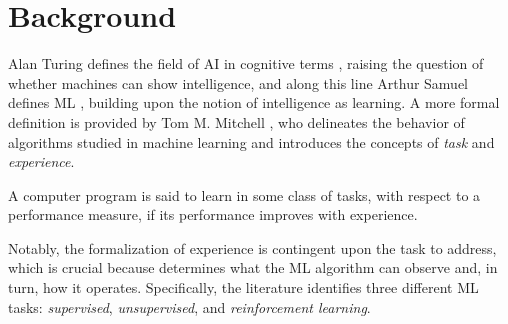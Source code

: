 \documentclass[a4paper,12pt,times,numbered,print,index]{Classes/PhDThesisPSnPDF}
\begin{document}





\chapter{Background}
\label{chap:background}

Alan Turing defines the field of AI in cognitive terms \cite{turing1980computing}, raising the question of whether machines can show intelligence, and along this line Arthur Samuel defines ML \cite{samuel2000some}, building upon the notion of intelligence as learning.
A more formal definition is provided by Tom M. Mitchell \citep{mitchell1997machine}, who delineates the behavior of algorithms studied in machine learning and introduces the concepts of \textit{task} and \textit{experience}.
\begin{definition}
    A computer program is said to learn in some class of tasks, with respect to a performance measure, if its performance improves with experience.
\end{definition}
Notably, the formalization of experience is contingent upon the task to address, which is crucial because determines what the ML algorithm can observe and, in turn, how it operates.
Specifically, the literature identifies three different ML tasks: \textit{supervised}, \textit{unsupervised}, and \textit{reinforcement learning}.
\end{document}
